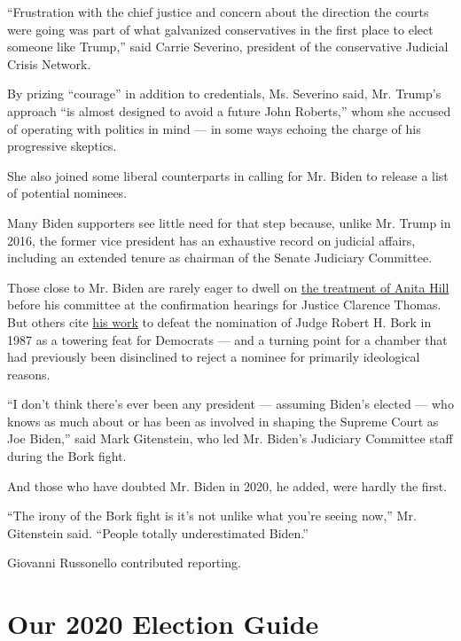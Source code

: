 ``Frustration with the chief justice and concern about the direction the
courts were going was part of what galvanized conservatives in the first
place to elect someone like Trump,'' said Carrie Severino, president of
the conservative Judicial Crisis Network.

By prizing ``courage'' in addition to credentials, Ms. Severino said,
Mr. Trump's approach ``is almost designed to avoid a future John
Roberts,'' whom she accused of operating with politics in mind --- in
some ways echoing the charge of his progressive skeptics.

She also joined some liberal counterparts in calling for Mr. Biden to
release a list of potential nominees.

Many Biden supporters see little need for that step because, unlike Mr.
Trump in 2016, the former vice president has an exhaustive record on
judicial affairs, including an extended tenure as chairman of the Senate
Judiciary Committee.

Those close to Mr. Biden are rarely eager to dwell on
\href{https://www.nytimes.com/2019/04/25/us/politics/joe-biden-anita-hill.html}{the
treatment of Anita Hill} before his committee at the confirmation
hearings for Justice Clarence Thomas. But others cite
\href{https://www.nytimes.com/2019/09/07/us/politics/joe-biden-bork-supreme-court.html}{his
work} to defeat the nomination of Judge Robert H. Bork in 1987 as a
towering feat for Democrats --- and a turning point for a chamber that
had previously been disinclined to reject a nominee for primarily
ideological reasons.

``I don't think there's ever been any president --- assuming Biden's
elected --- who knows as much about or has been as involved in shaping
the Supreme Court as Joe Biden,'' said Mark Gitenstein, who led Mr.
Biden's Judiciary Committee staff during the Bork fight.

And those who have doubted Mr. Biden in 2020, he added, were hardly the
first.

``The irony of the Bork fight is it's not unlike what you're seeing
now,'' Mr. Gitenstein said. ``People totally underestimated Biden.''

Giovanni Russonello contributed reporting.

\hypertarget{our-2020-election-guide}{%
\section{Our 2020 Election Guide}\label{our-2020-election-guide}}

